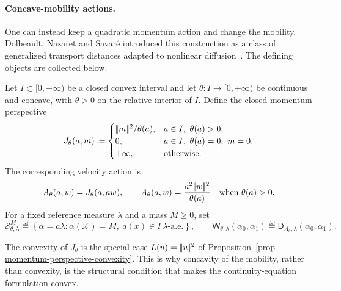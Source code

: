 \paragraph{Concave-mobility actions.}
One can instead keep a quadratic momentum action and change the mobility. Dolbeault, Nazaret and Savar\'e introduced this construction as a class of generalized transport distances adapted to nonlinear diffusion~\cite{dolbeault2009new}. The defining objects are collected below.
\begin{defn}\label{def-concave-mobility-distance}
Let \(I\subset[0,+\infty)\) be a closed convex interval and let \(\theta:I\to[0,+\infty)\) be continuous and concave, with $\theta>0$ on the relative interior of $I$. Define the closed momentum perspective
\[
	J_\theta(a,m)
	\coloneqq
	\begin{cases}
		|\!| m |\!|^2/\theta(a), & a\in I,\ \theta(a)>0,\\
		0, & a\in I,\ \theta(a)=0,\ m=0,\\
		+\infty, & \text{otherwise}.
	\end{cases}
\]
The corresponding velocity action is
\[
	A_\theta(a,w)=J_\theta(a,aw),
	\qquad
	A_\theta(a,w)=\frac{a^2|\!| w |\!|^2}{\theta(a)}\quad\text{when }\theta(a)>0.
\]
For a fixed reference measure $\lambda$ and a mass $M\geq0$, set
\[
	\mathcal S_{\theta,\lambda}^M
	\eqdef
	\left\{\alpha=a\lambda:\alpha(\mathcal X)=M,\ a(x)\in I\ \lambda\text{-a.e.}\right\},
	\qquad
	\mathsf W_{\theta,\lambda}(\alpha_0,\alpha_1)
	\eqdef
	\mathsf D_{A_\theta,\lambda}(\alpha_0,\alpha_1).
\]
\end{defn}
The convexity of \(J_\theta\) is the special case \(L(u)=|\!| u |\!|^2\) of Proposition~\ref{prop-momentum-perspective-convexity}. This is why concavity of the mobility, rather than convexity, is the structural condition that makes the continuity-equation formulation convex.

